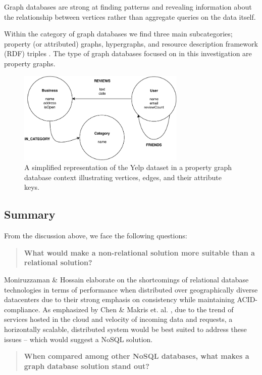 Graph databases are strong at finding patterns and revealing information about the relationship between vertices rather than aggregate queries on the data itself.

Within the category of graph databases we find three main subcategories; property (or attributed) graphs, hypergraphs, and resource description framework (RDF) triples \cite{socialdata}. The type of graph databases focused on in this investigation are property graphs.

\begin{figure}[h]
    \centering
    \includegraphics[width=8cm]{img/graph-db.pdf}
    \caption{A simplified representation of the Yelp dataset in a property graph database context illustrating vertices, edges, and their attribute keys.}
    \label{fig:graph-db}
\end{figure}

\subsection{Summary}

From the discussion above, we face the following questions:

\begin{quote}
    \textbf{What would make a non-relational solution more suitable than a relational solution?}
\end{quote}

Moniruzzaman \& Hossain \cite{nosql-db} elaborate on the shortcomings of relational database technologies in terms of performance when distributed over geographically diverse datacenters due to their strong emphasis on consistency while maintaining ACID-compliance. As emphasized by Chen \cite{socialdata} \& Makris et. al. \cite{mongovspostgres}, due to the trend of services hosted in the cloud and velocity of incoming data and requests, a horizontally scalable, distributed system would be best suited to address these issues -- which would suggest a NoSQL solution.

\begin{quote}
    \textbf{When compared among other NoSQL databases, what makes a graph database solution stand out?}
\end{quote}

